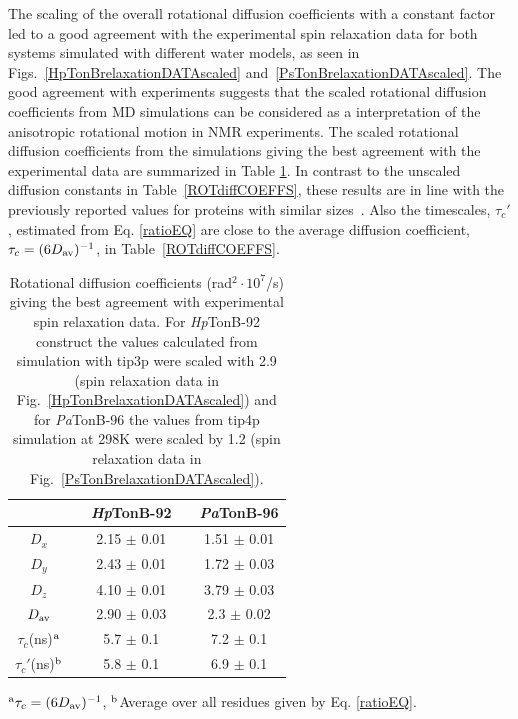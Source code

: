 \documentclass[journal=jpcbfk,manuscript=article]{achemso}
\begin{document}
The scaling of the overall rotational diffusion coefficients
with a constant factor led to a good agreement with the experimental
spin relaxation data for both systems simulated with different water models,
as seen in Figs.~\ref{HpTonBrelaxationDATAscaled} and~\ref{PsTonBrelaxationDATAscaled}.
The good agreement with experiments suggests that the scaled rotational diffusion coefficients
from MD simulations can be considered as a interpretation of the anisotropic rotational motion in NMR experiments.
The scaled rotational diffusion coefficients from the simulations giving the best agreement
with the experimental data are summarized in Table \ref{ROTdiffCOEFFSscaled}.
In contrast to the unscaled diffusion constants in Table~\ref{ROTdiffCOEFFS},
these results are in line with the previously reported values for proteins
with similar sizes~\cite{krishnan98}. Also the timescales, $\tau_{c}'$, estimated from 
Eq. \ref{ratioEQ} are close to the average diffusion coefficient, $\tau_{c}=(6D_{\rm av})^{-1}$,
in Table~\ref{ROTdiffCOEFFS}.
\begin{table}[!h]
  \centering
  \caption{Rotational diffusion coefficients (rad$^2\cdot 10^7$/s) giving the best agreement with experimental spin relaxation data.
    For {\it Hp}TonB-92 construct the values calculated from simulation with tip3p were scaled with 2.9
    (spin relaxation data in Fig.~\ref{HpTonBrelaxationDATAscaled}) and  for {\it Pa}TonB-96
    the values from tip4p simulation at 298K were scaled by 1.2 (spin relaxation data in
    Fig.~\ref{PsTonBrelaxationDATAscaled}). 
  }\label{ROTdiffCOEFFSscaled}
  \begin{tabular}{c c c c c}
    &    &  {\it Hp}TonB-92  &  & {\it Pa}TonB-96 \\
    \hline
    $D_{x}$        &    &   2.15 $\pm$ 0.01  & & 1.51  $\pm$ 0.01\\
    $D_{y}$        &    &  2.43  $\pm$ 0.01  & & 1.72  $\pm$ 0.03\\
    $D_{z}$        &    &  4.10   $\pm$ 0.01 & & 3.79  $\pm$ 0.03\\
    $D_{\rm av}$        &    &   2.90  $\pm$ 0.03  & & 2.3  $\pm$ 0.02\\
    $\tau_{c}$(ns)$^{\rm a}$  &    &  5.7   $\pm$ 0.1  & & 7.2 $\pm$ 0.1 \\
    $\tau_{c}'$(ns)$^{\rm b}$  &    &  5.8   $\pm$ 0.1 & & 6.9   $\pm$ 0.1 \\
  \end{tabular}
  \newline
  \flushleft
  $^{\rm a}\tau_{c}=(6D_{\rm av})^{-1}$, $^{\rm b}$Average over all residues given by Eq. \ref{ratioEQ}.
\end{table} 
\end{document}
